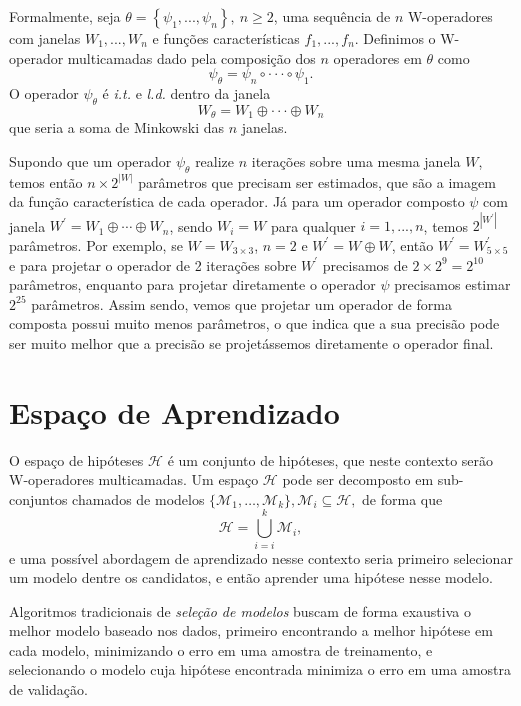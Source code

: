 Formalmente, seja $\theta = \left\{ \psi_{1}, ..., \psi_{n} \right\}, \ n \geq 2$, uma sequência de $n$ W-operadores com janelas $W_{1}, ...,  W_{n} $ e funções características $f_{1}, ..., f_{n}$. Definimos o W-operador multicamadas dado pela composição dos $n$ operadores em $\theta$ como
$$ \psi_{\theta} = \psi_{n} \circ \cdot \cdot \cdot \circ \psi_{1}. $$
O operador $\psi_{\theta}$ é \textit{i.t.} e \textit{l.d.} dentro da janela
$$W_{\theta} = W_{1} \oplus \cdot \cdot \cdot \oplus W_{n} $$
que seria a soma de Minkowski das $n$ janelas. 

Supondo que um operador $ \psi_{\theta} $ realize $n$ iterações sobre uma mesma janela $W$, temos então $n \times 2^{ \left| W \right|}$ parâmetros que precisam ser estimados, que são a imagem da função característica de cada operador. Já para um operador composto $\psi$ com janela $W^{\prime} = W_{1} \oplus \cdots \oplus W_{n}$, sendo $W_{i} = W$ para qualquer $i=1,...,n$, temos $2^{\left| W^{\prime} \right|}$ parâmetros. Por exemplo, se $W = W_{3 \times 3}$, $n = 2$ e $W^{\prime} = W \oplus W$, então $W^{\prime} = W^{\prime}_{5 \times 5}$ e para projetar o operador de 2 iterações sobre $W^{\prime}$ precisamos de $2 \times 2^{9} = 2^{10}$ parâmetros, enquanto para projetar diretamente o operador $\psi$ precisamos estimar $2^{25}$ parâmetros. Assim sendo, vemos que projetar um operador de forma composta possui muito menos parâmetros, o que indica que a sua precisão pode ser muito melhor que a precisão se projetássemos diretamente o operador final.

\section{Espaço de Aprendizado}
\label{sec:ls}

O espaço de hipóteses $\mathcal{H}$ é um conjunto de hipóteses, que neste contexto serão W-operadores multicamadas. Um espaço $\mathcal{H}$ pode ser decomposto em sub-conjuntos chamados de modelos $\{\mathcal{M}_{1},\dots,\mathcal{M}_{k}\}, \mathcal{M}_{i} \subseteq \mathcal{H},$ de forma que
$$\mathcal{H} = \bigcup_{i=i}^{k} \mathcal{M}_{i}, $$
e uma possível abordagem de aprendizado nesse contexto seria primeiro selecionar um modelo dentre os candidatos, e então aprender uma hipótese nesse modelo.

Algoritmos tradicionais de \textit{seleção de modelos} buscam de forma exaustiva o melhor modelo baseado nos dados, primeiro encontrando a melhor hipótese em cada modelo, minimizando o erro em uma amostra de treinamento, e selecionando o modelo cuja hipótese encontrada minimiza o erro em uma amostra de validação.

